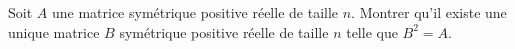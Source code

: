 Soit $A$ une matrice symétrique positive réelle de taille $n$. Montrer qu'il existe une unique
matrice $B$ symétrique positive réelle de taille $n$ telle que $B^2=A$.
